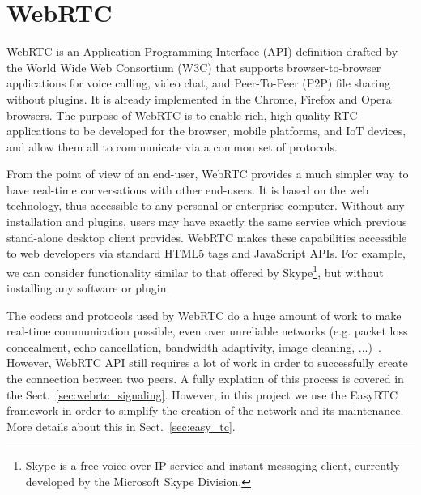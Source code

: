 \chapter{WebRTC}
\label{cha:webrtc}

WebRTC is an Application Programming Interface (API) definition drafted by the World Wide Web Consortium (W3C) that supports browser-to-browser applications for voice calling, video chat, and Peer-To-Peer (P2P) file sharing without plugins. It is already implemented in the Chrome, Firefox and Opera browsers. The purpose of WebRTC is to enable rich, high-quality RTC applications to be developed for the browser, mobile platforms, and IoT devices, and allow them all to communicate via a common set of protocols. 

From the point of view of an end-user, WebRTC provides a much simpler way to have real-time conversations with other end-users. It is based on the web technology, thus accessible to any personal or enterprise computer. Without any installation and plugins, users may have exactly the same service which previous stand-alone desktop client provides. WebRTC makes these capabilities accessible to web developers via standard HTML5 tags and JavaScript APIs. For example, we can consider functionality similar to that offered by Skype\footnote{Skype is a free voice-over-IP service and instant messaging client, currently developed by the Microsoft Skype Division.}, but without installing any software or plugin. 

The codecs and protocols used by WebRTC do a huge amount of work to make real-time communication possible, even over unreliable networks (e.g. packet loss concealment, echo cancellation, bandwidth adaptivity, image cleaning, ...)~\cite{started_with_webrtc}. However, WebRTC API still requires a lot of work in order to successfully create the connection between two peers. A fully explation of this process is covered in the Sect.~\ref{sec:webrtc_signaling}. However, in this project we use the EasyRTC\cite{easyrtc} framework in order to simplify the creation of the network and its maintenance. More details about this in Sect.~\ref{sec:easy_tc}.

